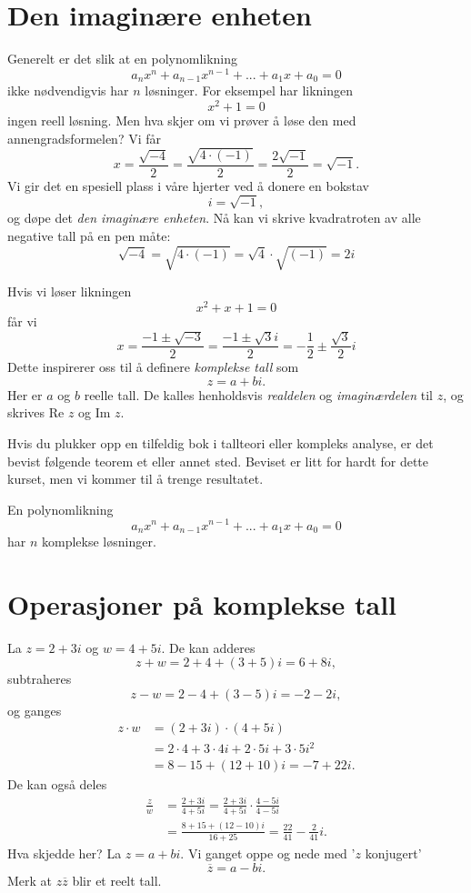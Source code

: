 

\label{ch:komplekse-tall}
\section*{Den imaginære enheten}
Generelt er det slik at en polynomlikning
\[
a_nx^n+a_{n-1}x^{n-1}+...+a_1x+a_0=0
\]
ikke nødvendigvis har $n$ løsninger. For eksempel har likningen 
\[
x^2+1=0
\]
ingen reell løsning. Men hva skjer om vi prøver å løse den med annengradsformelen? Vi får
\[
x=\frac{\sqrt{-4}}{2}=\frac{\sqrt{4\cdot (-1)}}{2}=\frac{2\sqrt{-1}}{2}=\sqrt{-1}.
\]
Vi gir det en spesiell plass i våre hjerter ved å donere en bokstav
\[
i=\sqrt{-1},
\]
og døpe det \emph{den imaginære enheten}. Nå kan vi skrive kvadratroten av alle negative tall på en pen måte:
\begin{equation*}
\sqrt{-4}=\sqrt{4\cdot (-1)}=\sqrt{4}\cdot \sqrt{(-1)}=2i
\end{equation*}


Hvis vi løser likningen
\[
x^2+x+1=0
\]
får vi 
\[
x=\frac{-1\pm \sqrt{-3}}{2}=\frac{-1\pm \sqrt{3}i}{2}=-\frac{1}{2}\pm\frac{\sqrt{3}}{2}i
\]
Dette inspirerer oss til å definere \emph{komplekse tall} som 
\[
z=a+bi.
\]
Her er $a$ og $b$ reelle tall. De kalles henholdsvis \emph{realdelen} og \emph{imaginærdelen} til $z$, og skrives Re $z$ og Im $z$. 

Hvis du plukker opp en tilfeldig bok i tallteori eller kompleks analyse, er det bevist følgende teorem et eller annet sted. Beviset er litt for hardt for dette kurset, men vi kommer til å trenge resultatet.
\begin{thm}
En polynomlikning
\[
a_nx^n+a_{n-1}x^{n-1}+...+a_1x+a_0=0
\]
har $n$ komplekse løsninger.
\end{thm}

\section*{Operasjoner på komplekse tall}
La $z=2+3i$ og $w=4+5i$. De kan adderes
\[
z+w=2+4+(3+5)i=6+8i,
\]
subtraheres
\[
z-w=2-4+(3-5)i=-2-2i,
\]
og ganges 
\begin{align*}
z\cdot w&=(2+3i)\cdot(4+5i)\\&=2\cdot 4+3\cdot 4i+2\cdot 5i+3\cdot 5 i^2\\&=8-15+(12+10)i=-7+22i.
\end{align*}
De kan også deles
\begin{align*}
\frac{z}{w}&=\frac{2+3i}{4+5i}=\frac{2+3i}{4+5i}\cdot\frac{4-5i}{4-5i}\\&=\frac{8+15+(12-10)i}{16+25}=\frac{22}{41}-\frac{2}{41}i.
\end{align*}
Hva skjedde her? La $z=a+bi$. Vi ganget oppe og nede med '$z$ konjugert'
\[
\overline z =a-bi.
\]
Merk at $z\overline z$ blir et reelt tall. 


